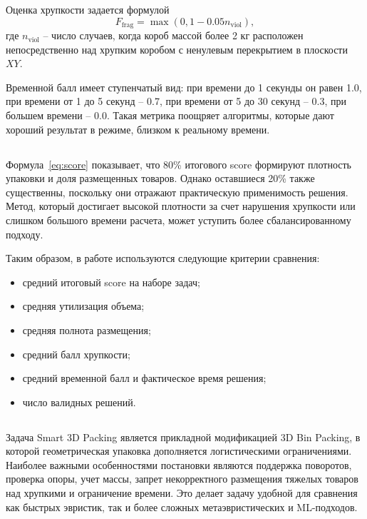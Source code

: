 Оценка хрупкости задается формулой
\begin{equation}
F_{\mathrm{frag}}=\max(0, 1-0.05n_{\mathrm{viol}}),
\label{eq:frag}
\end{equation}
где $n_{\mathrm{viol}}$ -- число случаев, когда короб массой более 2 кг расположен непосредственно над хрупким коробом с ненулевым перекрытием в плоскости $XY$.

Временной балл имеет ступенчатый вид: при времени до 1 секунды он равен 1.0, при времени от 1 до 5 секунд -- 0.7, при времени от 5 до 30 секунд -- 0.3, при большем времени -- 0.0. Такая метрика поощряет алгоритмы, которые дают хороший результат в режиме, близком к реальному времени.

\subsection{}

Формула~\eqref{eq:score} показывает, что 80\% итогового score формируют плотность упаковки и доля размещенных товаров. Однако оставшиеся 20\% также существенны, поскольку они отражают практическую применимость решения. Метод, который достигает высокой плотности за счет нарушения хрупкости или слишком большого времени расчета, может уступить более сбалансированному подходу.

Таким образом, в работе используются следующие критерии сравнения:
\begin{itemize}
  \item средний итоговый score на наборе задач;
  \item средняя утилизация объема;
  \item средняя полнота размещения;
  \item средний балл хрупкости;
  \item средний временной балл и фактическое время решения;
  \item число валидных решений.
\end{itemize}

\subsection{}

Задача Smart 3D Packing является прикладной модификацией 3D Bin Packing, в которой геометрическая упаковка дополняется логистическими ограничениями. Наиболее важными особенностями постановки являются поддержка поворотов, проверка опоры, учет массы, запрет некорректного размещения тяжелых товаров над хрупкими и ограничение времени. Это делает задачу удобной для сравнения как быстрых эвристик, так и более сложных метаэвристических и ML-подходов.
